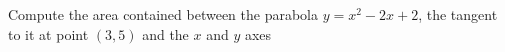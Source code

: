 
%
%
%
%
% 
% 

\question[4] Compute the area contained between the parabola $y=x^2-2x+2$, the
tangent to it at point $(3,5)$ and the $x$ and $y$ axes


